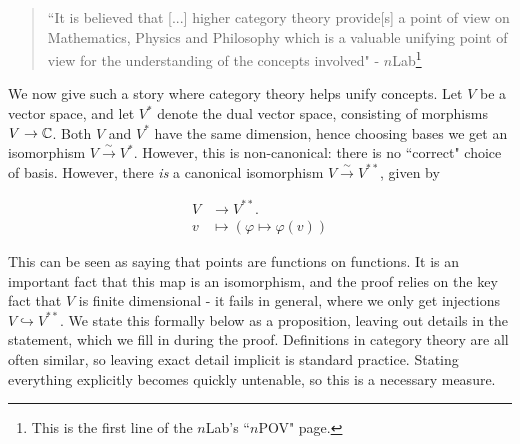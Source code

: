 \documentclass{article}
\theoremstyle{definition}
\numberwithin{figure}{section}
\begin{document}
\begin{quote}
``It is believed that [...] higher category theory provide[s] a point of view on Mathematics, Physics and Philosophy which is a valuable unifying point of view for the understanding of the concepts involved" - $n$Lab\footnote{This is the first line of the $n$Lab's ``$n$POV" page.}
\end{quote}

We now give such a story where category theory helps unify concepts. Let $V$ be a vector space, and let $V^*$ denote the dual vector space, consisting of morphisms $V\to \mathbb{C}$. Both $V$ and $V^*$ have the same dimension, hence choosing bases we get an isomorphism $V\xrightarrow{\sim}V^*$. However, this is non-canonical: there is no ``correct" choice of basis. However, there \textit{is} a canonical isomorphism $V\xrightarrow{\sim}V^{**}$, given by

\begin{align*}
V&\xrightarrow{}V^{**}.\\
v&\mapsto (\varphi\mapsto \varphi(v))
\end{align*}

This can be seen as saying that points are functions on functions. It is an important fact that this map is an isomorphism, and the proof relies on the key fact that $V$ is finite dimensional - it fails in general, where we only get injections $V\hookrightarrow{} V^{**}$. We state this formally below as a proposition, leaving out details in the statement, which we fill in during the proof. Definitions in category theory are all often similar, so leaving exact detail implicit is standard practice. Stating everything explicitly becomes quickly untenable, so this is a necessary measure.
\end{document}
